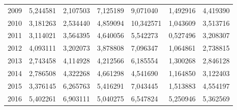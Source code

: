 \begin{table}
\begin{tabular}{p{1cm}p{2cm}p{2cm}p{2cm}p{2cm}p{2cm}p{2cm}}
 2009 &                               5,244581 &                 2,107503 &                                    7,125189 &                        9,071040 &          1,492916 &                    4,419390 \\
 2010 &                               3,181263 &                 2,534440 &                                    4,859094 &                       10,342571 &          1,043609 &                    3,513716 \\
 2011 &                               3,114021 &                 3,564395 &                                    4,640056 &                        5,542273 &          0,527496 &                    3,208307 \\
 2012 &                               4,093111 &                 3,202073 &                                    3,878808 &                        7,096347 &          1,064861 &                    2,738815 \\
 2013 &                               2,743458 &                 4,114928 &                                    4,212566 &                        6,185554 &          1,300268 &                    2,846128 \\
 2014 &                               2,786508 &                 4,322268 &                                    4,661298 &                        4,541690 &          1,164850 &                    3,122403 \\
 2015 &                               3,376145 &                 6,265763 &                                    5,416291 &                        7,043445 &          1,513883 &                    4,554197 \\
 2016 &                               5,402261 &                 6,903111 &                                    5,040275 &                        6,547824 &          5,250946 &                    5,362569 \\
\bottomrule
\end{tabular}
\end{table}
